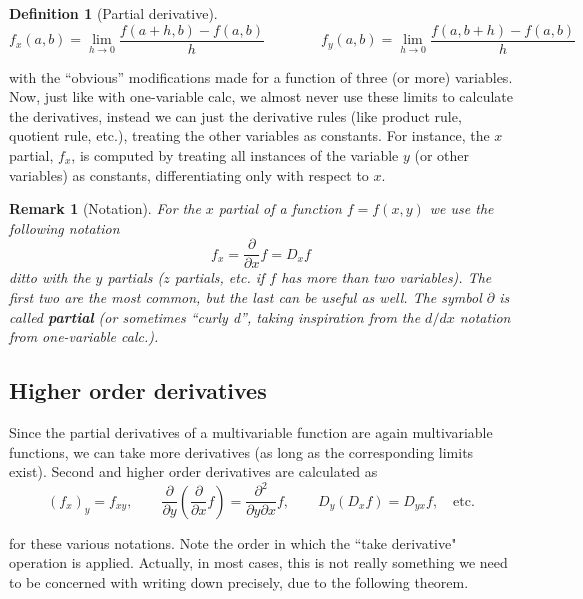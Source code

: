 \documentclass[12pt]{article}
\numberwithin{equation}{subsection}
\numberwithin{figure}{subsection}
\newtheorem{defn}[subsection]{Definition}
\theoremstyle{note}
\newtheorem{remark}[subsection]{Remark}
\begin{document}
{\begin{defn}[Partial derivative]
\begin{equation} 
	f_x(a,b)=\lim_{h\to 0} \dfrac{f(a+h,b)-f(a,b)}{h} \qquad \qquad f_y(a,b)=\lim_{h\to 0} \dfrac{f(a, b+h)-f(a,b)}{h} \label{partials}
\end{equation}
\end{defn}

with the ``obvious'' modifications made for a function of three (or more) variables. Now, just like with one-variable calc, we almost never use these limits to calculate the derivatives, instead we can just the derivative rules (like product rule, quotient rule, etc.), treating the other variables as constants. For instance, the $x$ partial, $f_x$, is computed by treating all instances of the variable $y$ (or other variables) as constants, differentiating only with respect to $x$.

\begin{remark}[Notation] For the $x$ partial of a function $f=f(x,y)$ we use the following notation \begin{equation} f_x= \dfrac{\partial}{\partial x} f=D_x f\end{equation} ditto with the $y$ partials ($z$ partials, etc. if $f$ has more than two variables). The first two are the most common, but the last can be useful as well. The symbol $\partial$ is called \textbf{partial} (or sometimes ``curly d'', taking inspiration from the $d/dx$ notation from one-variable calc.). \end{remark}

\subsection{Higher order derivatives} Since the partial derivatives of a multivariable function are again multivariable functions, we can take more derivatives (as long as the corresponding limits exist). Second and higher order derivatives are calculated as \begin{equation} (f_x)_y=f_{xy},\qquad \dfrac{\partial }{\partial y} \left(\dfrac{\partial }{\partial x}f\right)=\dfrac{\partial^2 }{\partial y \partial x}f, \qquad D_y \left(D_x f\right)=D_{yx}f, \quad \text{etc.}\end{equation}


for these various notations. Note the order in which the ``take derivative" operation is applied. Actually, in most cases, this is not really something we need to be concerned with writing down precisely, due to the following theorem.

}
\end{document}
